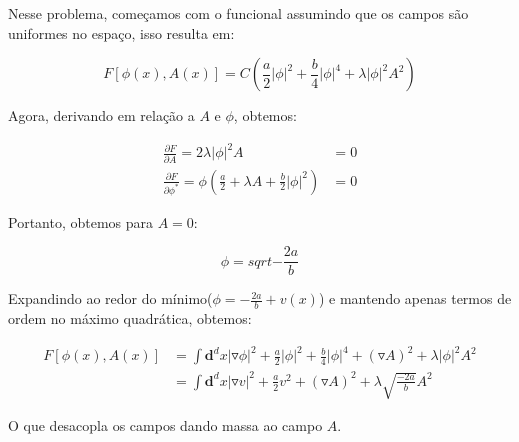 Nesse problema, começamos com o funcional assumindo que os campos são uniformes no espaço, isso resulta em:

\begin{equation}
F[\phi(x),A(x)] = C \left( \frac{a}{2} |\phi|^2 + \frac{b}{4} |\phi|^4 +  \lambda |\phi|^2 A^2 \right)
\end{equation}

Agora, derivando em relação a $A$ e $\phi$, obtemos:

\begin{subequations}
\begin{align}
\frac{\partial F}{\partial A} = 2\lambda |\phi|^2 A &= 0 \\
\frac{\partial F}{\partial \phi^*} = \phi \left( \frac{a}{2} + \lambda A + \frac{b}{2}|\phi|^2\right) &=0
\end{align}
\end{subequations}

Portanto, obtemos para $A=0$:

\begin{equation}
\phi = sqrt{-\frac{2a}{b}}
\end{equation}

Expandindo ao redor do mínimo($\phi = -\frac{2a}{b} + v(x)$) e mantendo apenas termos de ordem no máximo quadrática, obtemos:

\begin{equation}
\begin{split}
F[\phi(x),A(x)] &= \int \mathbf{d}^d x |\triangledown \phi|^2 + \frac{a}{2} |\phi|^2 + \frac{b}{4} |\phi|^4 + (\triangledown A)^2 + \lambda |\phi|^2 A^2 \\
&= \int \mathbf{d}^d x |\triangledown v|^2 + \frac{a}{2} v^2 + (\triangledown A)^2 + \lambda \sqrt{\frac{-2a}{b}} A^2
\end{split}
\end{equation}

O que desacopla os campos dando massa ao campo $A$.